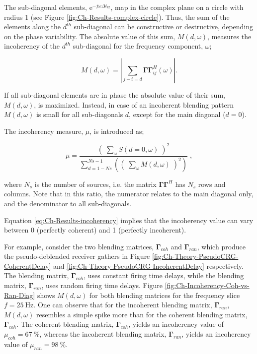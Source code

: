 The sub-diagonal elements, $\mathrm{e}^{-j \omega \Delta t_{kl}}$, map in the complex plane on a circle with radius 1 (see Figure \ref{fig:Ch-Results-complex-circle}). Thus, the sum of the elements along the $d^{th}$ sub-diagonal can be constructive or destructive, depending on the phase variability. The absolute value of this sum, $M(d,\omega)$, measures the incoherency of the $d^{th}$ sub-diagonal for the frequency component, $\omega$;

\begin{equation}
	M(d,\omega) = \left| \sum_{j-i=d} \mathbf{\Gamma \Gamma}^H_{ij} (\omega) \right|.
	\label{eq:Ch-Results-incoherency-diagsum}	
\end{equation} 

If all sub-diagonal elements are in phase the absolute value of their sum, $M(d,\omega)$, is maximized. Instead, in case of an incoherent blending pattern $M(d,\omega)$ is small for all sub-diagonals $d$, except for the main diagonal ($d = 0$).  

The incoherency measure, $\mu$, is introduced as;

\begin{equation}
	\mu = \frac{\left( \; \sum_{\omega}S(d=0,\omega) \; \right)^2}{\sum_{d = 1-Ns}^{Ns-1} \left(\left( \; \sum_{\omega}M(d,\omega) \; \right)^2\right)} \; ,
	\label{eq:Ch-Results-incoherency}
\end{equation}

where $N_s$ is the number of sources, i.e. the matrix $\mathbf{\Gamma \Gamma}^H$ has $N_s$ rows and columns. Note that in this ratio, the numerator relates to the main diagonal only, and the denominator to all sub-diagonals.

Equation \ref{eq:Ch-Results-incoherency} implies that the incoherency value can vary between 0 (perfectly coherent) and 1 (perfectly incoherent).

For example, consider the two blending matrices, $\mathbf{\Gamma}_{coh}$ and $\mathbf{\Gamma}_{ran}$, which produce the pseudo-deblended receiver gathers in Figure \ref{fig:Ch-Theory-PseudoCRG-CoherentDelay} and \ref{fig:Ch-Theory-PseudoCRG-IncoherentDelay} respectively. The blending matrix, $\mathbf{\Gamma}_{coh}$, uses constant firing time delays, while the blending matrix, $\mathbf{\Gamma}_{ran}$, uses random firing time delays. Figure \ref{fig:Ch-Incoherency-Coh-vs-Ran-Diag} shows $M(d,\omega)$ for both blending matrices for the frequency slice $f=\SI{25}{\hertz}$. One can observe that for the incoherent blending matrix, $\mathbf{\Gamma}_{ran}$, $M(d,\omega)$ resembles a simple spike more than for the coherent blending matrix, $\mathbf{\Gamma}_{coh}$. The coherent blending matrix, $\mathbf{\Gamma}_{coh}$,  yields an incoherency value of $\mu_{coh} = \SI{67}{\percent}$, whereas the incoherent blending matrix, $\mathbf{\Gamma}_{ran}$, yields an incoherency value of $\mu_{ran} = \SI{98}{\percent}$.

